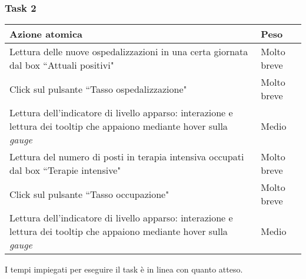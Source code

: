 \subsubsection{Task 2}
\label{sss:iaa-task-2}

{
\renewcommand{\arraystretch}{2}
\begin{longtable}[h]{| p{14cm} | p{2.5cm} |}
    \hline
    \textbf{Azione atomica} & \textbf{Peso} \\
    \hline
    \endhead
    Lettura delle nuove ospedalizzazioni in una certa giornata dal box ``Attuali positivi" & Molto breve \\
    \hline
    Click sul pulsante ``Tasso ospedalizzazione" & Molto breve \\
    \hline
    Lettura dell'indicatore di livello apparso: interazione e lettura dei tooltip che appaiono mediante hover sulla \textit{gauge} & Medio \\
    \hline
    Lettura del numero di posti in terapia intensiva occupati dal box ``Terapie intensive" & Molto breve \\
    \hline
    Click sul pulsante ``Tasso occupazione" & Molto breve \\
    \hline
    Lettura dell'indicatore di livello apparso: interazione e lettura dei tooltip che appaiono mediante hover sulla \textit{gauge} & Medio \\
    \hline
\end{longtable}
}
I tempi impiegati per eseguire il task è in linea con quanto atteso.